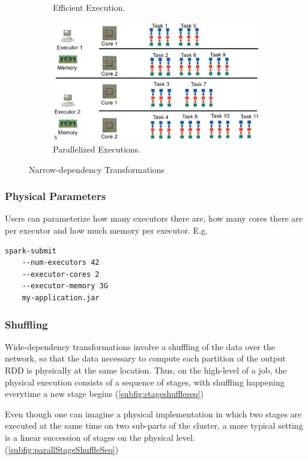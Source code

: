 \begin{figure}[h]
\begin{subfigure}{0.47\textwidth}
        \caption{Efficient Execution.}\label{subfig:EffEx}
    \end{subfigure}
    \hfill
    \begin{subfigure}{0.47\textwidth}
        \centering
        \includegraphics[width=\textwidth]{Figures/BetterNDChain.jpeg}
        \caption{Parallelized Executions.}\label{subfig:BetterNDChain}
    \end{subfigure}
    \caption{Narrow-dependency Transformations}\label{fig:NDTransfo}
\end{figure}

\subsubsection{Physical Parameters}
Users can parameterize how many executors there are, how many cores there are per executor and how much memory per executor. E.g.

\begin{lstlisting}[style=Java]
spark-submit
    --num-executors 42
    --executor-cores 2
    --executor-memory 3G
    my-application.jar
\end{lstlisting}

\subsubsection{Shuffling}
Wide-dependency transformations involve a shuffling of the data over the network, so that the data necessary to compute each partition of the output RDD is physically at the same location. Thus, on the high-level of a job, the physical execution consists of a sequence of stages, with shuffling happening everytime a new stage begins (\cref{subfig:stageshuffleseq})

Even though one can imagine a physical implementation in which two stages are executed at the same time on two sub-parts of the cluster, a more typical setting is a linear succession of stages on the physical level. (\cref{subfig:parallStageShuffleSeq})

